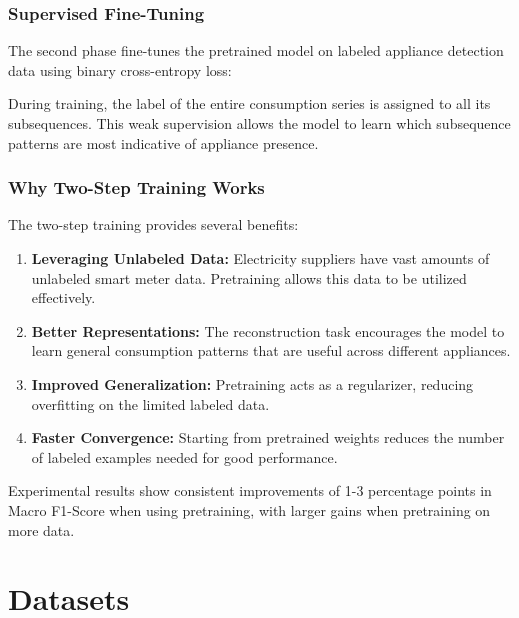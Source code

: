 \documentclass[conference]{IEEEtran}
\begin{document}
\subsubsection{Supervised Fine-Tuning}

The second phase fine-tunes the pretrained model on labeled appliance detection data using binary cross-entropy loss:


During training, the label of the entire consumption series is assigned to all its subsequences. This weak supervision allows the model to learn which subsequence patterns are most indicative of appliance presence.

\subsubsection{Why Two-Step Training Works}

The two-step training provides several benefits:

\begin{enumerate}
    \item \textbf{Leveraging Unlabeled Data:} Electricity suppliers have vast amounts of unlabeled smart meter data. Pretraining allows this data to be utilized effectively.
    
    \item \textbf{Better Representations:} The reconstruction task encourages the model to learn general consumption patterns that are useful across different appliances.
    
    \item \textbf{Improved Generalization:} Pretraining acts as a regularizer, reducing overfitting on the limited labeled data.
    
    \item \textbf{Faster Convergence:} Starting from pretrained weights reduces the number of labeled examples needed for good performance.
\end{enumerate}

Experimental results show consistent improvements of 1-3 percentage points in Macro F1-Score when using pretraining, with larger gains when pretraining on more data.

\section{Datasets}
\label{sec:datasets}
\end{document}
